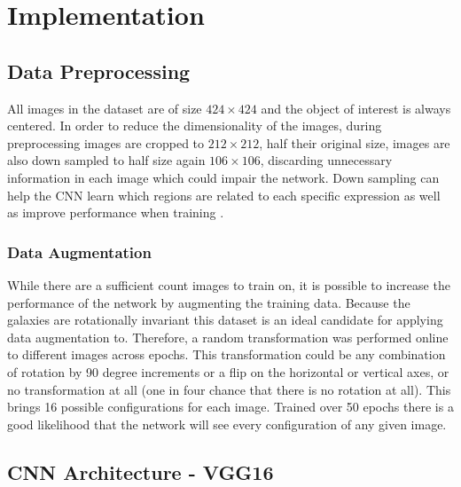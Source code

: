 \section{Implementation}


\subsection{Data Preprocessing}

All images in the dataset are of size $424\times424$ and the object of interest is always centered. In order to reduce the dimensionality of the images, during preprocessing images are cropped to $212\times212$, half their original size, images are also down sampled to half size again $ 106\times 106$, discarding unnecessary information in each image which could impair the network. Down sampling can help the CNN learn which regions are related to each specific expression as well as improve performance when training \cite{deep-learning-review}.

\subsubsection{Data Augmentation}\label{aug}
While there are a sufficient count images to train on, it is possible to increase the performance of the network by augmenting the training data. Because the galaxies are rotationally invariant this dataset is an ideal candidate for applying data augmentation to. Therefore, a random transformation was performed online to different images across epochs. This transformation could be any combination of rotation by 90 degree increments or a flip on the horizontal or vertical axes, or no transformation at all (one in four chance that there is no rotation at all). This brings 16 possible configurations for each image. Trained over 50 epochs there is a good likelihood that the network will see every configuration of any given image.

\subsection{CNN Architecture - VGG16}

\newcommand{\anet}{AlexNet\xspace}
\newcommand{\gnet}{GoogLeNet\xspace}
\newcommand{\inet}{ImageNet\xspace}

